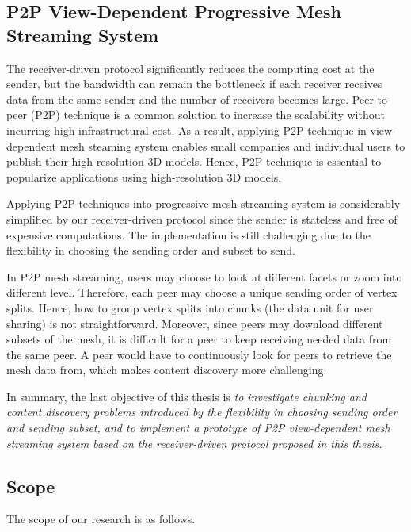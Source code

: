     \subsection{P2P View-Dependent Progressive Mesh Streaming System}
    The receiver-driven protocol significantly reduces the computing cost at the sender,
    but the bandwidth can remain the bottleneck if each receiver receives data
    from the same sender and the number of receivers becomes large. 
    Peer-to-peer (P2P) technique is a common solution to increase
    the scalability without incurring high infrastructural cost. 
    As a result, applying P2P technique in view-dependent mesh steaming
    system enables small companies and individual users to publish
    their high-resolution 3D models. Hence, P2P technique is essential
    to popularize applications using high-resolution 3D models.
    
    Applying P2P techniques into progressive mesh streaming system
    is considerably simplified by our receiver-driven protocol since 
    the sender is stateless and free of expensive computations.
    The implementation is still challenging due to the flexibility
    in choosing the sending order and subset to send.
    
    In P2P mesh streaming, users 
    may choose to look at different facets or zoom into different level.
    Therefore, each peer may choose a unique sending order of
    vertex splits. Hence, how to group vertex splits into chunks (the data unit
    for user sharing) is not straightforward. 
    Moreover, since peers may download different subsets of the
    mesh, it is difficult for a peer to keep receiving
    needed data from the same peer.  
    A peer would have to continuously look for peers to retrieve the mesh data from, 
    which makes content discovery more challenging.

    In summary, the last objective of this thesis is 
    \textit{
            to investigate chunking and content discovery problems introduced by 
            the flexibility in choosing sending order and sending subset, and
            to implement a prototype of P2P view-dependent mesh streaming system
            based on the receiver-driven protocol proposed in this thesis.
            }
    
    \subsection{Scope}
            The scope of our research is as follows.

